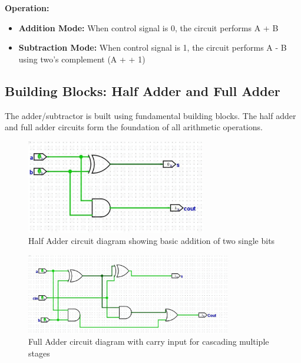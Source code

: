 \textbf{Operation:}
\begin{itemize}
    \item \textbf{Addition Mode:} When control signal is 0, the circuit performs A + B
    \item \textbf{Subtraction Mode:} When control signal is 1, the circuit performs A - B using two's complement (A +  + 1)
\end{itemize}

\subsection{Building Blocks: Half Adder and Full Adder}

The adder/subtractor is built using fundamental building blocks. The half adder and full adder circuits form the foundation of all arithmetic operations.

\begin{figure}[h]
    \centering
    \includegraphics[width=0.7\textwidth]{half-adder}
    \caption{Half Adder circuit diagram showing basic addition of two single bits}
    \label{fig:half-adder}
\end{figure}

\begin{figure}[h]
    \centering
    \includegraphics[width=0.8\textwidth]{full-adder}
    \caption{Full Adder circuit diagram with carry input for cascading multiple stages}
    \label{fig:full-adder}
\end{figure}

